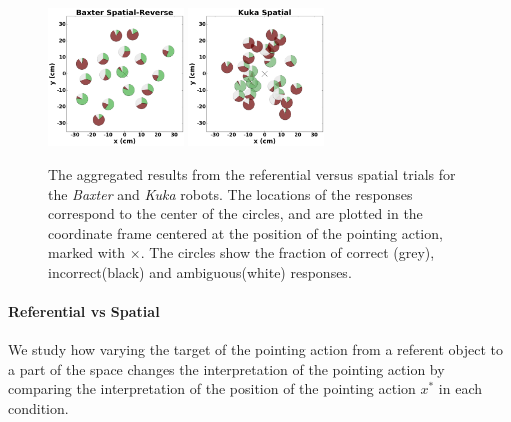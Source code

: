 \begin{figure}[th!]
    \includegraphics[width=0.32\textwidth ]{figures/baxter_Spatial-Reverse_.png}
    \includegraphics[width=0.32\textwidth ]{figures/kuka_Spatial_.png}
    \caption{The aggregated results from the referential versus spatial trials for the \textit{Baxter} and \textit{Kuka} robots. The locations of the responses correspond to the center of the circles, and are plotted in the coordinate frame centered at the position of the pointing action, marked with $\times$. The circles show the fraction of correct (grey), incorrect(black) and ambiguous(white) responses.}
    \label{fig:aggregatesimple}
\end{figure}



\paragraph{Referential vs Spatial}
We study how varying the target of the pointing action from a referent object to a part of the space changes the interpretation of the pointing action by comparing the interpretation of the position of the pointing action $x^*$ in each condition. 

